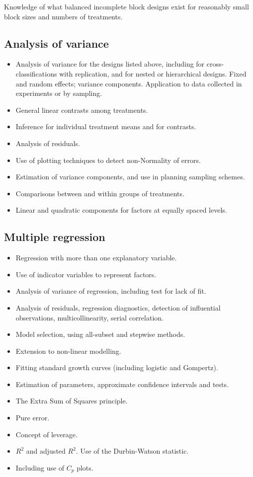 Knowledge of what balanced incomplete block designs exist for reasonably small block sizes and numbers of treatments.

\subsection*{Analysis of variance}
\begin{itemize}
\item	Analysis of variance for the designs listed above, including for cross-classifications with replication, and for nested or hierarchical designs. Fixed and random effects; variance components. Application to data collected in experiments or by sampling.
\item	General linear contrasts among treatments. 
\item	Inference for individual treatment means and for contrasts.
\item	Analysis of residuals. 
\item	Use of plotting techniques to detect non-Normality of errors.
\item	Estimation of variance components, and use in planning sampling schemes.
\item	Comparisons between and within groups of treatments. 
\item	Linear and quadratic components for factors at equally spaced levels.
\end{itemize}
\subsection*{Multiple regression}
\begin{itemize}
\item	Regression with more than one explanatory variable. 
\item	Use of indicator variables to represent factors. 
\item	Analysis of variance of regression, including test for lack of fit. 
\item	Analysis of residuals, regression diagnostics, detection of influential observations, multicollinearity, serial correlation. 
\item	Model selection, using all-subset and stepwise methods.
\item	Extension to non-linear modelling. 
\item	Fitting standard growth curves (including logistic and Gompertz). 
\item	Estimation of parameters, approximate confidence intervals and tests.
\item	The Extra Sum of Squares principle.
\item	Pure error.
\item	Concept of leverage. 
\item	$R^2$ and adjusted $R^2$. Use of the Durbin-Watson statistic.
\item	Including use of $C_p$ plots.
\end{itemize}

